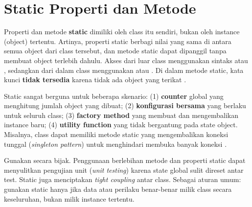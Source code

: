 \section{Static Properti dan Metode}

Properti dan metode \textbf{static} dimiliki oleh class itu sendiri, bukan oleh instance (object) tertentu. Artinya, properti static berbagi nilai yang sama di antara semua object dari class tersebut, dan metode static dapat dipanggil tanpa membuat object terlebih dahulu. Akses dari luar class menggunakan sintaks  atau , sedangkan dari dalam class menggunakan  atau . Di dalam metode static, kata kunci  \textbf{tidak tersedia} karena tidak ada object yang terikat \cite{phpManual}.

Static sangat berguna untuk beberapa skenario: (1) \textbf{counter} global yang menghitung jumlah object yang dibuat; (2) \textbf{konfigurasi bersama} yang berlaku untuk seluruh class; (3) \textbf{factory method} yang membuat dan mengembalikan instance baru; (4) \textbf{utility function} yang tidak bergantung pada state object. Misalnya, class  dapat memiliki metode static  yang mengembalikan koneksi tunggal (\textit{singleton pattern}) untuk menghindari membuka banyak koneksi \cite{phpRightWay}.


\begin{catatan}
Gunakan  secara bijak. Penggunaan berlebihan metode dan properti static dapat menyulitkan pengujian unit (\textit{unit testing}) karena state global sulit direset antar test. Static juga menciptakan \textit{tight coupling} antar class. Sebagai aturan umum: gunakan static hanya jika data atau perilaku benar-benar milik class secara keseluruhan, bukan milik instance tertentu.
\end{catatan}


